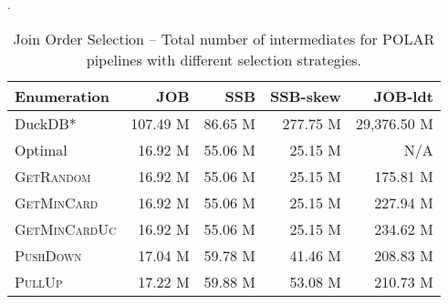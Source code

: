 \begin{table}[!t]
	\centering
	\caption{Join Order Selection -- Total number of intermediates for POLAR pipelines with different selection strategies.}.
	\vspace{-0.3cm}  \setlength\tabcolsep{3.5pt}
	\begin{tabular}{lrrrr}
	  \toprule
		\textbf{Enumeration} & \textbf{JOB} & \textbf{SSB} & \textbf{SSB-skew} & \textbf{JOB-ldt} \\
		\midrule
    DuckDB* &     107.49 M &     86.65 M &    277.75 M & 29,376.50 M\\
		Optimal &      16.92 M &      55.06 M &      25.15 M & N/A\\
        \midrule
		\textsc{GetRandom} &      16.92 M &      55.06 M &      25.15 M & 175.81 M\\
		\textsc{GetMinCard} &      16.92 M &      55.06 M &      25.15 M & 227.94 M\\
		\textsc{GetMinCardUc} &      16.92 M &      55.06 M &      25.15 M & 234.62 M\\
		\textsc{PushDown} &      17.04 M &      59.78 M &      41.46 M & 208.83 M\\
		\textsc{PullUp} &      17.22 M &      59.88 M &      53.08 M & 210.73 M\\
		\bottomrule
	\end{tabular}
	\label{tab:1_1_sel_intms}
\end{table}
